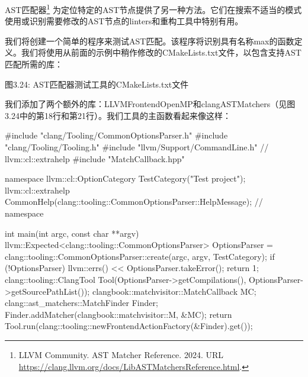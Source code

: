 AST匹配器\footnote{LLVM Community. AST Matcher Reference. 2024. URL \url{https://clang.llvm.org/docs/LibASTMatchersReference.html}.} 为定位特定的AST节点提供了另一种方法。它们在搜索不适当的模式使用或识别需要修改的AST节点的linters和重构工具中特别有用。

我们将创建一个简单的程序来测试AST匹配。该程序将识别具有名称max的函数定义。我们将使用从前面的示例中稍作修改的CMakeLists.txt文件，以包含支持AST匹配所需的库：


\begin{center}
图3.24: AST匹配器测试工具的CMakeLists.txt文件
\end{center}

我们添加了两个额外的库：LLVMFrontendOpenMP和clangASTMatchers（见图3.24中的第18行和第21行）。我们工具的主函数看起来像这样：

\begin{cpp}
#include "clang/Tooling/CommonOptionsParser.h"
#include "clang/Tooling/Tooling.h"
#include "llvm/Support/CommandLine.h" // llvm::cl::extrahelp
#include "MatchCallback.hpp"

namespace {
llvm::cl::OptionCategory TestCategory("Test project");
llvm::cl::extrahelp
  CommonHelp(clang::tooling::CommonOptionsParser::HelpMessage);
} // namespace

int main(int argc, const char **argv) {
  llvm::Expected<clang::tooling::CommonOptionsParser> OptionsParser =
    clang::tooling::CommonOptionsParser::create(argc, argv, TestCategory);
  if (!OptionsParser) {
    llvm::errs() << OptionsParser.takeError();
    return 1;
  }
  clang::tooling::ClangTool Tool(OptionsParser->getCompilations(),
                                 OptionsParser->getSourcePathList());
  clangbook::matchvisitor::MatchCallback MC;
  clang::ast_matchers::MatchFinder Finder;
  Finder.addMatcher(clangbook::matchvisitor::M, &MC);
  return Tool.run(clang::tooling::newFrontendActionFactory(&Finder).get());
}
\end{cpp}

